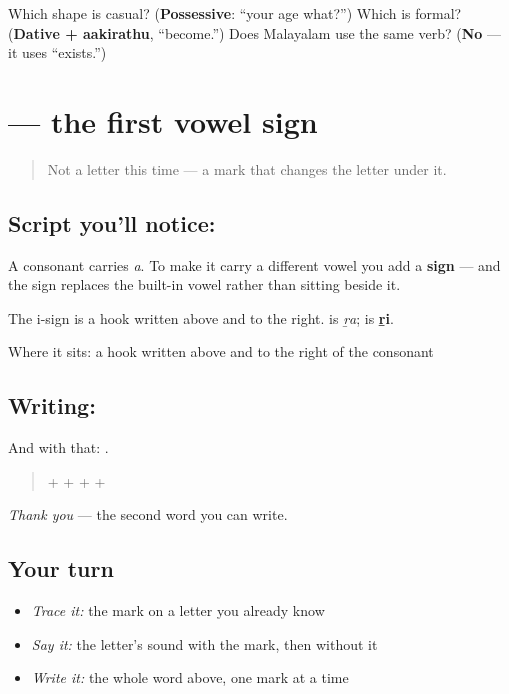 \begin{tcolorbox}[breakable,colback=teal!4,colframe=teal!35!black,title={Before you move on}]
Which shape is casual? (\textbf{Possessive}: \textquotedblleft{}your age what?\textquotedblright{}) Which is formal? (\textbf{Dative + aakirathu}, \textquotedblleft{}become.\textquotedblright{}) Does Malayalam use the same verb? (\textbf{No} — it uses \textquotedblleft{}exists.\textquotedblright{})
\end{tcolorbox}
\section[\texorpdfstring{\ta{ி} (i sign)}{ி (i sign)}]{ — the first vowel sign}

\label{lesson:TA-S09-i-sign}



\begin{quote}
Not a letter this time — a mark that changes the letter under it.
\end{quote}

\subsection*{Script you'll notice: }
A consonant carries \emph{a}. To make it carry a different vowel you add a \textbf{sign} — and the sign replaces the built-in vowel rather than sitting beside it.

The i-sign is a hook written above and to the right.  is \emph{ṟa};  is \textbf{ṟi}.

Where it sits: a hook written above and to the right of the consonant

\subsection*{Writing: }

And with that: .

\begin{quote}
 +  +  +  + 
\end{quote}

\emph{Thank you} — the second word you can write.

\subsection*{Your turn}
\begin{itemize}
\raggedright
  \item \emph{Trace it:} the mark on a letter you already know
  \item \emph{Say it:} the letter's sound with the mark, then without it
  \item \emph{Write it:} the whole word above, one mark at a time
\end{itemize}

